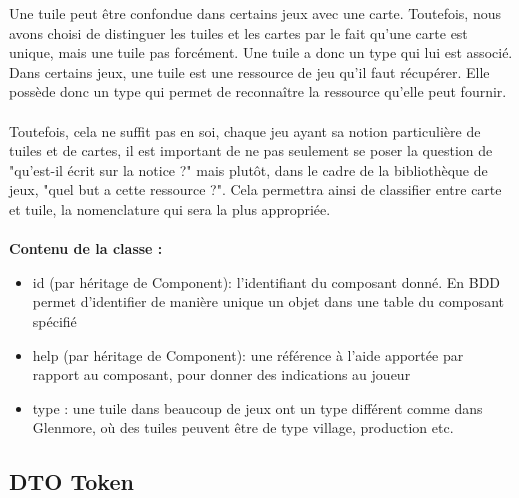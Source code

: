\documentclass{article}
\begin{document}
                Une tuile peut être confondue dans certains jeux avec une carte. Toutefois, nous avons choisi de distinguer les tuiles et les cartes par le fait qu'une carte est unique, mais une tuile pas forcément. Une tuile a donc un type qui lui est associé.\\
                \indent Dans certains jeux, une tuile est une ressource de jeu qu'il faut récupérer. Elle possède donc un type qui permet de reconnaître la ressource qu'elle peut fournir. \\
                \\
                \indent Toutefois, cela ne suffit pas en soi, chaque jeu ayant sa notion particulière de tuiles et de cartes, il est important de ne pas seulement se poser la question de "qu'est-il écrit sur la notice ?" mais plutôt, dans le cadre de la bibliothèque de jeux, "quel but a cette ressource ?". Cela permettra ainsi de classifier entre carte et tuile, la nomenclature qui sera la plus appropriée.\\
                \\
                \textbf{Contenu de la classe :}
                \begin{itemize}
                    \item id (par héritage de Component): l'identifiant du composant donné. En BDD permet d'identifier de manière unique un objet dans une table du composant spécifié
                    \item help (par héritage de Component): une référence à l'aide apportée par rapport au composant, pour donner des indications au joueur
                    \item type : une tuile dans beaucoup de jeux ont un type différent comme dans Glenmore, où des tuiles peuvent être de type village, production etc.
                \end{itemize}

            \subsection{DTO Token}
\end{document}
